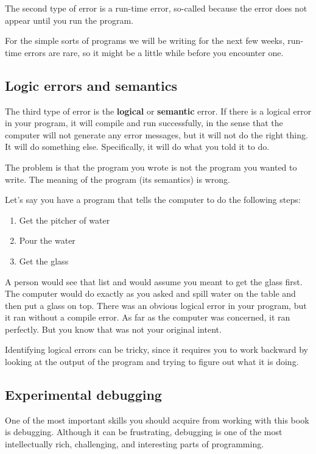 The second type of error is a run-time error, so-called because
the error does not appear until you run the program.

For the simple sorts of programs we will be writing for the
next few weeks, run-time errors are rare, so it might be a little
while before you encounter one.


\subsection{Logic errors and semantics}

The third type of error is the {\bf logical} or {\bf semantic}
error.  If there is a logical error in your program, it will
compile and run successfully, in the sense that the computer
will not generate any error messages, but it will not do the
right thing.  It will do something else.  Specifically, it will
do what you told it to do.

The problem is that the program you wrote is not the program
you wanted to write.  The meaning of the program (its semantics)
is wrong.  

Let's say you have a program that tells the computer to do the following steps:
\begin{enumerate}
    \item Get the pitcher of water
    \item Pour the water
    \item Get the glass
\end{enumerate}
A person would see that list and would assume you meant to get the glass first. The computer would do exactly as you asked and spill water on the table and then put a glass on top. There was an obvious logical error in your program, but it ran without a compile error. As far as the computer was concerned, it ran perfectly. But you know that was not your original intent.

Identifying logical errors can be tricky, since
it requires you to work backward by looking at the output
of the program and trying to figure out what it is doing.

\subsection{Experimental debugging}

One of the most important skills you should acquire from working with
this book is debugging.  Although it can be frustrating, debugging is
one of the most intellectually rich, challenging, and interesting
parts of programming.

